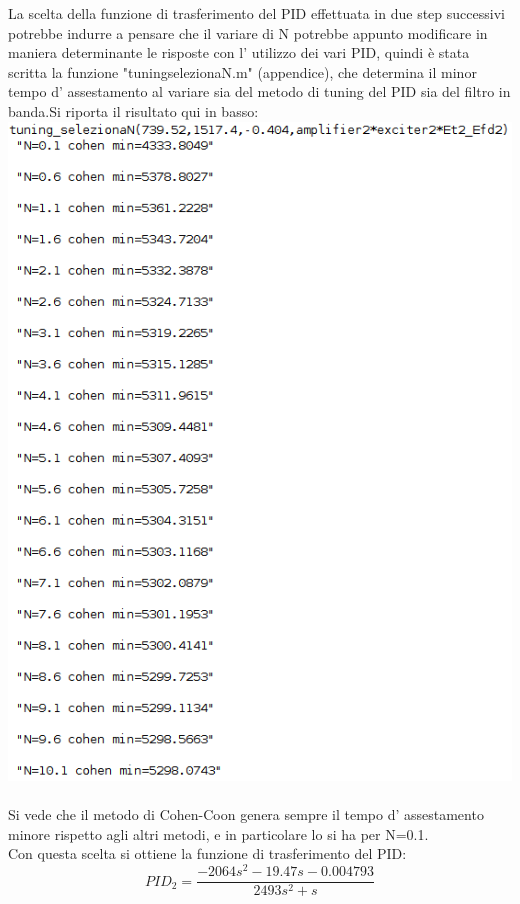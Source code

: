 \documentclass[Lau,noexaminfo]{sapthesis}
\begin{document}
	La scelta della funzione di trasferimento del PID effettuata in due step successivi potrebbe indurre a pensare che il variare di N potrebbe appunto modificare in maniera determinante le risposte con l' utilizzo dei vari PID, quindi è stata scritta la funzione "tuning\textunderscore selezionaN.m" (appendice), che determina il minor tempo d' assestamento al variare sia del metodo di tuning del PID sia del filtro in banda.Si riporta il risultato qui in basso:\\
	\includegraphics[scale=0.5]{tuning_selezionaN_P2} \\\\
	Si vede che il metodo di Cohen-Coon genera sempre il tempo d' assestamento minore rispetto agli altri metodi, e in particolare lo si ha per N=0.1.\\
	Con questa scelta si ottiene la funzione di trasferimento del PID:
	\begin{equation*}
	PID_2=\frac{-2064s^2-19.47s-0.004793}{2493s^2+s}
	\end{equation*}
\end{document}
